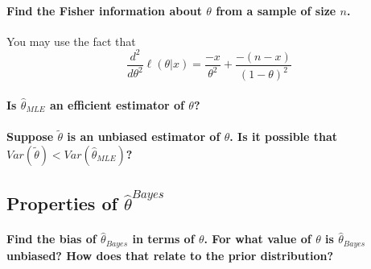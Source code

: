 \documentclass[]{article}
\let\oldparagraph\paragraph
\renewcommand{\paragraph}[1]{\oldparagraph{#1}\mbox{}}
\begin{document}
\vspace{3cm}

\paragraph{\texorpdfstring{Find the Fisher information about \(\theta\)
from a sample of size
\(n\).}{Find the Fisher information about \textbackslash{}theta from a sample of size n.}}\label{find-the-fisher-information-about-theta-from-a-sample-of-size-n.}

You may use the fact that
\[\frac{d^2}{d \theta^2} \ell(\theta|x) = \frac{-x}{\theta^2} + \frac{-(n - x)}{(1 - \theta)^2}\]

\vspace{3cm}

\paragraph{\texorpdfstring{Is \(\hat{\theta}_{MLE}\) an efficient
estimator of
\(\theta\)?}{Is \textbackslash{}hat\{\textbackslash{}theta\}\_\{MLE\} an efficient estimator of \textbackslash{}theta?}}\label{is-hattheta_mle-an-efficient-estimator-of-theta}

\vspace{3cm}

\paragraph{\texorpdfstring{Suppose \(\tilde{\theta}\) is an unbiased
estimator of \(\theta\). Is it possible that
\(Var(\tilde{\theta}) < Var(\hat{\theta}_{MLE})\)?}{Suppose \textbackslash{}tilde\{\textbackslash{}theta\} is an unbiased estimator of \textbackslash{}theta. Is it possible that Var(\textbackslash{}tilde\{\textbackslash{}theta\}) \textless{} Var(\textbackslash{}hat\{\textbackslash{}theta\}\_\{MLE\})?}}\label{suppose-tildetheta-is-an-unbiased-estimator-of-theta.-is-it-possible-that-vartildetheta-varhattheta_mle}

\newpage

\subsection{\texorpdfstring{Properties of
\(\hat{\theta}^{Bayes}\)}{Properties of \textbackslash{}hat\{\textbackslash{}theta\}\^{}\{Bayes\}}}\label{properties-of-hatthetabayes}

\paragraph{\texorpdfstring{Find the bias of \(\hat{\theta}_{Bayes}\) in
terms of \(\theta\). For what value of \(\theta\) is
\(\hat{\theta}_{Bayes}\) unbiased? How does that relate to the prior
distribution?}{Find the bias of \textbackslash{}hat\{\textbackslash{}theta\}\_\{Bayes\} in terms of \textbackslash{}theta. For what value of \textbackslash{}theta is \textbackslash{}hat\{\textbackslash{}theta\}\_\{Bayes\} unbiased? How does that relate to the prior distribution?}}\label{find-the-bias-of-hattheta_bayes-in-terms-of-theta.-for-what-value-of-theta-is-hattheta_bayes-unbiased-how-does-that-relate-to-the-prior-distribution}
\end{document}
